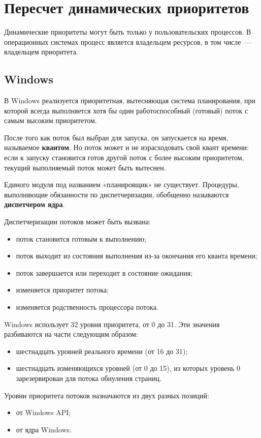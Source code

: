 
\chapter{Пересчет динамических приоритетов}

Динамические приоритеты могут быть только у пользовательских процессов. 
В операционных системах процесс является владельцем ресурсов, в том числе~---  владельцем приоритета.

\section{Windows}
В Windows реализуется приоритетная, вытесняющая система планирования, при  которой всегда выполняется хотя бы один работоспособный (готовый) поток с самым высоким приоритетом. 

После того как поток был выбран для запуска, он запускается на время, называемое \textbf{квантом}. 
Но поток может и не израсходовать свой квант времени: если к запуску становится готов другой поток с более высоким приоритетом, текущий выполняемый поток может быть вытеснен.

Единого модуля под названием «планировщик» не существует.
Процедуры, выполняющие обязанности по диспетчеризации, обобщенно называются \textbf{диспетчером ядра}. 

Диспетчеризации потоков может быть вызвана:
\begin{itemize}
	\item поток становится готовым к выполнению;
	\item поток выходит из состояния выполнения из-за окончания его кванта времени;
	\item поток завершается или переходит в состояние ожидания;
	\item изменяется приоритет потока;
	\item изменяется родственность процессора потока.
\end{itemize}

Windows использует 32 уровня приоритета, от 0 до 31. 
Эти значения разбиваются на части следующим образом:
\begin{itemize}
	\item шестнадцать уровней реального времени (от 16 до 31);
	\item шестнадцать изменяющихся уровней (от 0 до 15), из которых уровень 0 зарезервирован для потока обнуления страниц. 
\end{itemize}

Уровни приоритета потоков назначаются из двух разных позиций:
\begin{itemize}
	\item от Windows API;
	\item от ядра Windows.
\end{itemize}

